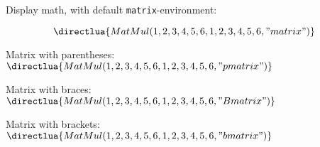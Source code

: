 \documentclass{article}
\newcommand\matrixmult[3][matrix]{\directlua{MatMul(#2,#3,"#1")}} %
\begin{document}
Display math, with default \verb|matrix|-environment:

\begin{equation}
\matrixmult{%
	{{1 , 2 , 3} ,%
	 {4 , 5 , 6}}%
}{%
	{{1 , 2} ,%
	 {3 , 4} ,%
	 {5 , 6}}%
}
\end{equation}


Matrix with parentheses:
$\matrixmult[pmatrix]{%
	{{1 , 2 , 3} ,%
	 {4 , 5 , 6}}%
}{%
	{{1 , 2} ,%
	 {3 , 4} ,%
	 {5 , 6}}%
}$


Matrix with braces:
$\matrixmult[Bmatrix]{%
	{{1 , 2 , 3} ,%
	 {4 , 5 , 6}}%
}{%
	{{1 , 2} ,%
	 {3 , 4} ,%
	 {5 , 6}}%
}$


Matrix with brackets:
$\matrixmult[bmatrix]{%
	{{1 , 2 , 3} ,%
	 {4 , 5 , 6}}%
}{%
	{{1 , 2} ,%
	 {3 , 4} ,%
	 {5 , 6}}%
}$
\end{document}

